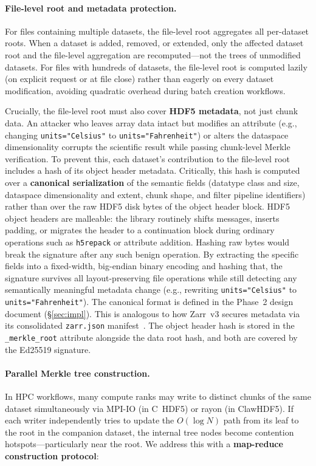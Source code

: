 \documentclass[11pt]{article}
\begin{document}
\paragraph{File-level root and metadata protection.}
For files containing multiple datasets, the file-level root aggregates all
per-dataset roots. When a dataset is added, removed, or extended, only the
affected dataset root and the file-level aggregation are recomputed---not the
trees of unmodified datasets. For files with hundreds of datasets, the
file-level root is computed lazily (on explicit request or at file close) rather
than eagerly on every dataset modification, avoiding quadratic overhead during
batch creation workflows.

Crucially, the file-level root must also cover \textbf{HDF5 metadata}, not just
chunk data. An attacker who leaves array data intact but modifies an attribute
(e.g., changing \texttt{units="Celsius"} to \texttt{units="Fahrenheit"}) or
alters the dataspace dimensionality corrupts the scientific result while passing
chunk-level Merkle verification. To prevent this, each dataset's contribution
to the file-level root includes a hash of its object header metadata.
Critically, this hash is computed over a \textbf{canonical serialization}
of the semantic fields (datatype class and size, dataspace dimensionality and
extent, chunk shape, and filter pipeline identifiers) rather than over the raw
HDF5 disk bytes of the object header block. HDF5 object headers are
malleable: the library routinely shifts messages, inserts padding, or migrates
the header to a continuation block during ordinary operations such as
\texttt{h5repack} or attribute addition. Hashing raw bytes would break the
signature after any such benign operation. By extracting the specific fields
into a fixed-width, big-endian binary encoding and hashing that, the signature
survives all layout-preserving file operations while still detecting any
semantically meaningful metadata change (e.g., rewriting
\texttt{units="Celsius"} to \texttt{units="Fahrenheit"}). The canonical
format is defined in the Phase~2 design document (\S\ref{sec:impl}).
This is analogous to how Zarr~v3 secures metadata via its consolidated
\texttt{zarr.json} manifest~\cite{zarr2024}. The object header hash is stored
in the \texttt{\_merkle\_root} attribute alongside the data root hash, and both
are covered by the Ed25519 signature.

\paragraph{Parallel Merkle tree construction.}
In HPC workflows, many compute ranks may write to distinct chunks of the same
dataset simultaneously via MPI-IO (in C~HDF5) or rayon (in ClawHDF5). If each
writer independently tries to update the $O(\log N)$ path from its leaf to the
root in the companion dataset, the internal tree nodes become contention
hotspots---particularly near the root. We address this with a
\textbf{map-reduce construction protocol}:
\end{document}
